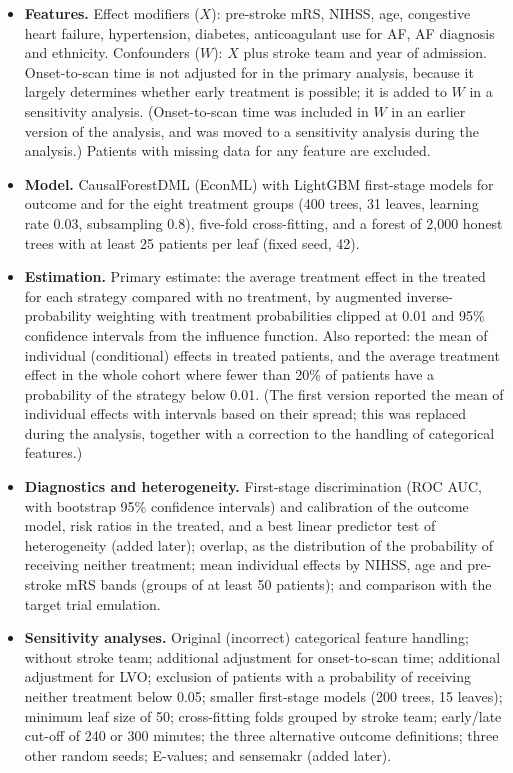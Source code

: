 \begin{itemize}
\item \textbf{Features.} Effect modifiers ($X$): pre-stroke mRS, NIHSS, age, congestive heart failure, hypertension, diabetes, anticoagulant use for AF, AF diagnosis and ethnicity. Confounders ($W$): $X$ plus stroke team and year of admission. Onset-to-scan time is not adjusted for in the primary analysis, because it largely determines whether early treatment is possible; it is added to $W$ in a sensitivity analysis. (Onset-to-scan time was included in $W$ in an earlier version of the analysis, and was moved to a sensitivity analysis during the analysis.) Patients with missing data for any feature are excluded.
\item \textbf{Model.} CausalForestDML (EconML) with LightGBM first-stage models for outcome and for the eight treatment groups (400 trees, 31 leaves, learning rate 0.03, subsampling 0.8), five-fold cross-fitting, and a forest of 2,000 honest trees with at least 25 patients per leaf (fixed seed, 42).
\item \textbf{Estimation.} Primary estimate: the average treatment effect in the treated for each strategy compared with no treatment, by augmented inverse-probability weighting with treatment probabilities clipped at 0.01 and 95\% confidence intervals from the influence function. Also reported: the mean of individual (conditional) effects in treated patients, and the average treatment effect in the whole cohort where fewer than 20\% of patients have a probability of the strategy below 0.01. (The first version reported the mean of individual effects with intervals based on their spread; this was replaced during the analysis, together with a correction to the handling of categorical features.)
\item \textbf{Diagnostics and heterogeneity.} First-stage discrimination (ROC AUC, with bootstrap 95\% confidence intervals) and calibration of the outcome model, risk ratios in the treated, and a best linear predictor test of heterogeneity (added later); overlap, as the distribution of the probability of receiving neither treatment; mean individual effects by NIHSS, age and pre-stroke mRS bands (groups of at least 50 patients); and comparison with the target trial emulation.
\item \textbf{Sensitivity analyses.} Original (incorrect) categorical feature handling; without stroke team; additional adjustment for onset-to-scan time; additional adjustment for LVO; exclusion of patients with a probability of receiving neither treatment below 0.05; smaller first-stage models (200 trees, 15 leaves); minimum leaf size of 50; cross-fitting folds grouped by stroke team; early/late cut-off of 240 or 300 minutes; the three alternative outcome definitions; three other random seeds; E-values; and sensemakr (added later).
\end{itemize}

